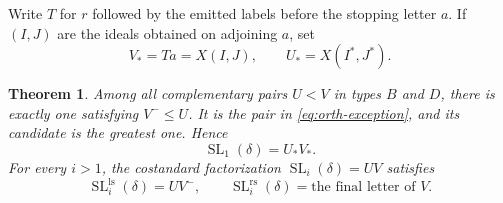 \documentclass[11pt]{amsart}
\numberwithin{equation}{section}
\newtheorem{theorem}{Theorem}[section]
\theoremstyle{definition}
\DeclareMathOperator{\SL}{SL}
\newcommand{\ls}{\mathrm{ls}}
\newcommand{\rs}{\mathrm{rs}}
\begin{document}
Write $T$ for $r$ followed by the emitted labels before the stopping letter $a$. If $(I,J)$ are the ideals obtained on adjoining $a$, set
\begin{equation}\label{eq:orth-exception}
 V_*=Ta=X(I,J),\qquad U_*=X(I^*,J^*).
\end{equation}

\begin{theorem}\label{thm:orthogonal-seam}
Among all complementary pairs $U<V$ in types $B$ and $D$, there is exactly one satisfying $V^-\leq U$. It is the pair in \eqref{eq:orth-exception}, and its candidate is the greatest one. Hence
\[
 \SL_1(\delta)=U_*V_*.
\]
For every $i>1$, the costandard factorization $\SL_i(\delta)=UV$ satisfies
\begin{equation}\label{eq:orth-standard-prefix}
 \SL_i^{\ls}(\delta)=UV^-,\qquad
 \SL_i^{\rs}(\delta)=\text{the final letter of }V.
\end{equation}
\end{theorem}
\end{document}
